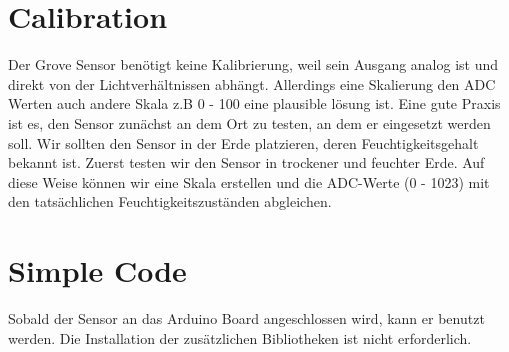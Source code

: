 





\section{Calibration}

Der Grove Sensor benötigt keine Kalibrierung, weil sein Ausgang analog ist und direkt von der Lichtverhältnissen abhängt. Allerdings eine Skalierung den ADC Werten auch andere Skala z.B 0 - 100 eine plausible lösung ist. Eine gute Praxis ist es, den Sensor zunächst an dem Ort zu testen, an dem er eingesetzt werden soll. Wir sollten den Sensor in der Erde platzieren, deren Feuchtigkeitsgehalt bekannt ist. Zuerst testen wir den Sensor in trockener und feuchter Erde. Auf diese Weise können wir eine Skala erstellen und die ADC-Werte (0 - 1023) mit den tatsächlichen Feuchtigkeitszuständen abgleichen.


\section{Simple Code}
Sobald der Sensor an das Arduino Board angeschlossen wird, kann er benutzt werden. Die Installation der zusätzlichen Bibliotheken ist nicht erforderlich.

